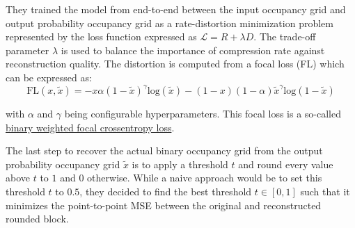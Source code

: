 They trained the model from end-to-end between the input occupancy grid and output probability occupancy grid as a rate-distortion minimization problem represented by the loss function expressed as $\mathcal{L} = R + \lambda D$. The trade-off parameter $\lambda$ is used to balance the importance of compression rate against reconstruction quality. 
The distortion is computed from a focal loss (FL) which can be expressed as: 
$$
\text{FL}(x, \tilde{x}) = -x \alpha (1-\tilde{x})^{\gamma} \text{log}(\tilde{x}) - (1-x) (1-\alpha) \tilde{x}^{\gamma} \text{log}(1-\tilde{x})
$$

\noindent with $\alpha$ and $\gamma$ being configurable hyperparameters. This focal loss is a so-called \href{https://www.tensorflow.org/api_docs/python/tf/keras/losses/BinaryFocalCrossentropy}{binary weighted focal crossentropy loss}.

The last step to recover the actual binary occupancy grid from the output probability occupancy grid $\tilde{x}$ is to apply a threshold $t$ and round every value above $t$ to $1$ and $0$ otherwise. While a naive approach would be to set this threshold $t$ to $0.5$, they decided to find the best threshold $t \in [0,1]$ such that it minimizes the point-to-point MSE between the original and reconstructed rounded block.
